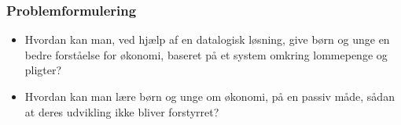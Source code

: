 
\begin{frame}
\frametitle{Problemformulering}
    \begin{itemize}
        \item{Hvordan kan man, ved hjælp af en datalogisk løsning, give børn og unge en bedre forståelse for økonomi, baseret på et system omkring lommepenge og pligter?}
        \vspace{\baselineskip}
        \item{Hvordan kan man lære børn og unge om økonomi, på en passiv måde, sådan at deres udvikling ikke bliver forstyrret?}
    \end{itemize}
\end{frame}
   

